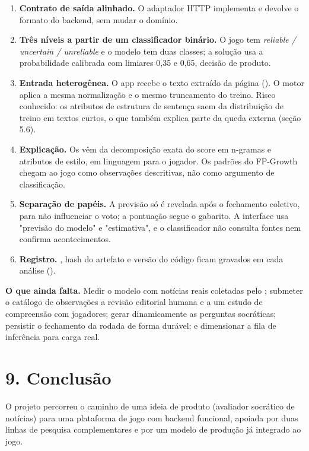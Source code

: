 \documentclass[
  brazilian,
  11pt,
]{article}
\begin{document}
\begin{enumerate}
\item \textbf{Contrato de saída alinhado.} O adaptador HTTP implementa  e devolve o formato do backend, sem mudar o domínio.
\item \textbf{Três níveis a partir de um classificador binário.} O jogo tem \emph{reliable / uncertain / unreliable} e o modelo tem duas classes; a solução usa a probabilidade calibrada com limiares 0,35 e 0,65, decisão de produto.
\item \textbf{Entrada heterogênea.} O app recebe o texto extraído da página (). O motor aplica a mesma normalização e o mesmo truncamento do treino. Risco conhecido: os atributos de estrutura de sentença saem da distribuição de treino em textos curtos, o que também explica parte da queda externa (seção 5.6).
\item \textbf{Explicação.} Os  vêm da decomposição exata do score em n-gramas e atributos de estilo, em linguagem para o jogador. Os padrões do FP-Growth chegam ao jogo como observações descritivas, não como argumento de classificação.
\item \textbf{Separação de papéis.} A previsão só é revelada após o fechamento coletivo, para não influenciar o voto; a pontuação segue o gabarito. A interface usa "previsão do modelo" e "estimativa", e o classificador não consulta fontes nem confirma acontecimentos.
\item \textbf{Registro.} , hash do artefato e versão do código ficam gravados em cada análise ().
\end{enumerate}

\textbf{O que ainda falta.} Medir o modelo com notícias reais coletadas pelo ; submeter o catálogo de observações a revisão editorial humana e a um estudo de compreensão com jogadores; gerar dinamicamente as perguntas socráticas; persistir o fechamento da rodada de forma durável; e dimensionar a fila de inferência para carga real.



\section{9. Conclusão}

O projeto percorreu o caminho de uma ideia de produto (avaliador socrático de notícias) para uma plataforma de jogo com backend funcional, apoiada por duas linhas de pesquisa complementares e por um modelo de produção já integrado ao jogo.
\end{document}
